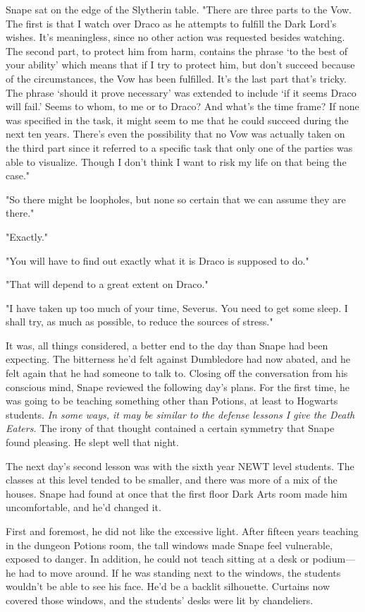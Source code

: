 Snape sat on the edge of the Slytherin table. "There are three parts to the Vow. The first is that I watch over Draco as he attempts to fulfill the Dark Lord's wishes. It's meaningless, since no other action was requested besides watching. The second part, to protect him from harm, contains the phrase `to the best of your ability' which means that if I try to protect him, but don't succeed because of the circumstances, the Vow has been fulfilled. It's the last part that's tricky. The phrase `should it prove necessary' was extended to include `if it seems Draco will fail.' Seems to whom, to me or to Draco? And what's the time frame? If none was specified in the task, it might seem to me that he could succeed during the next ten years. There's even the possibility that no Vow was actually taken on the third part since it referred to a specific task that only one of the parties was able to visualize. Though I don't think I want to risk my life on that being the case."

"So there might be loopholes, but none so certain that we can assume they are there."

"Exactly."

"You will have to find out exactly what it is Draco is supposed to do."

"That will depend to a great extent on Draco."

"I have taken up too much of your time, Severus. You need to get some sleep. I shall try, as much as possible, to reduce the sources of stress."

It was, all things considered, a better end to the day than Snape had been expecting. The bitterness he'd felt against Dumbledore had now abated, and he felt again that he had someone to talk to. Closing off the conversation from his conscious mind, Snape reviewed the following day's plans. For the first time, he was going to be teaching something other than Potions, at least to Hogwarts students. \emph{In some ways, it may be similar to the defense lessons I give the Death Eaters.} The irony of that thought contained a certain symmetry that Snape found pleasing. He slept well that night.

The next day's second lesson was with the sixth year NEWT level students. The classes at this level tended to be smaller, and there was more of a mix of the houses. Snape had found at once that the first floor Dark Arts room made him uncomfortable, and he'd changed it.

First and foremost, he did not like the excessive light. After fifteen years teaching in the dungeon Potions room, the tall windows made Snape feel vulnerable, exposed to danger. In addition, he could not teach sitting at a desk or podium—he had to move around. If he was standing next to the windows, the students wouldn't be able to see his face. He'd be a backlit silhouette. Curtains now covered those windows, and the students' desks were lit by chandeliers.

